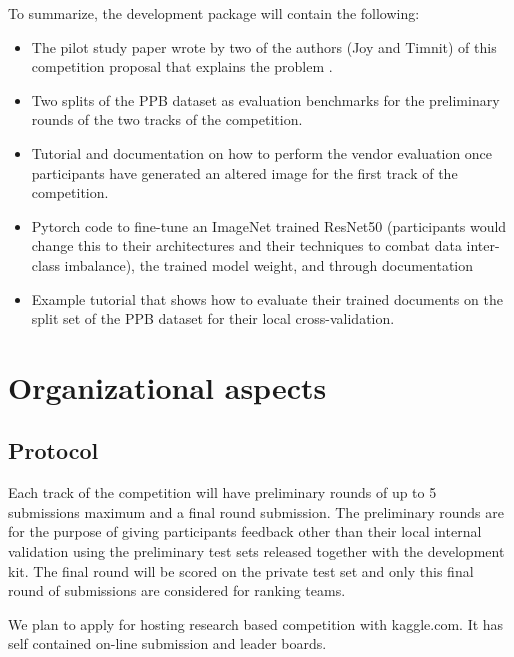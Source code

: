 \documentclass[11pt, oneside]{article}
\makeatletter
\let\@internalcite\cite
\def\cite{\def\citeauthoryear##1##2{##1, ##2}\@internalcite}
\makeatother
\begin{document}
To summarize, the development package will contain the following:

\begin{itemize}
	\item The pilot study paper wrote by two of the authors (Joy and Timnit) of this competition proposal that explains the problem \cite{buolamwini2018gender}.
	\item Two splits of the PPB dataset as evaluation benchmarks for the preliminary rounds of the two tracks of the competition.
	\item Tutorial and documentation on how to perform the vendor evaluation once participants have generated an altered image for the first track of the competition.
	\item Pytorch code to fine-tune an ImageNet trained ResNet50 (participants would change this to their architectures and their techniques to combat data inter-class imbalance), the trained model weight, and through documentation
	\item Example tutorial that shows how to evaluate their trained documents on the split set of the PPB dataset for their local cross-validation.
\end{itemize}

\section{Organizational aspects}
\subsection{Protocol}
\label{sec:protocol}

Each track of the competition will have preliminary rounds of up to 5 submissions maximum and a final round submission. The preliminary rounds are for the purpose of giving participants feedback other than their local internal validation using the preliminary test sets released together with the development kit. The final round will be scored on the private test set and only this final round of submissions are considered for ranking teams. 

We plan to apply for hosting research based competition with kaggle.com. It has self contained on-line submission and leader boards.
\end{document}
